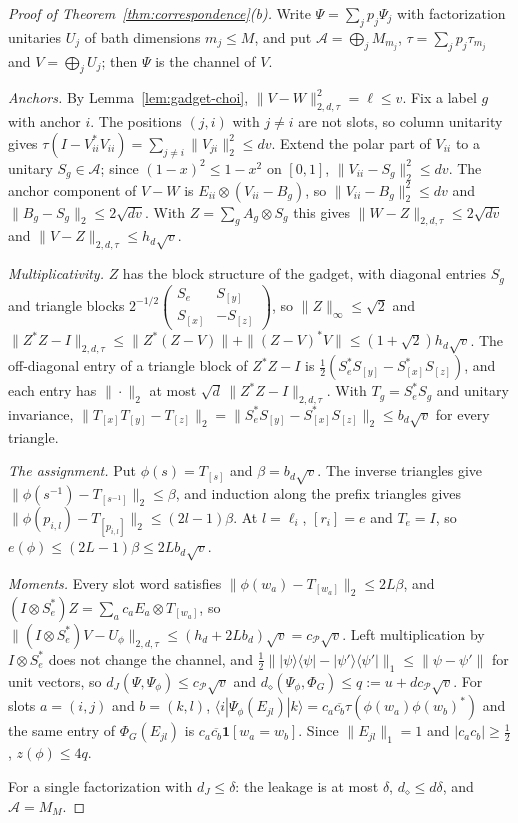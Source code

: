 \documentclass[11pt,a4paper]{article}
\theoremstyle{plain}
\theoremstyle{definition}
\theoremstyle{remark}
\newcommand{\dJ}{d_J}
\newcommand{\ddia}{d_\diamond}
\begin{document}
\begin{proof}[Proof of Theorem~\ref{thm:correspondence}(b)]
Write $\Psi=\sum_jp_j\Psi_j$ with factorization unitaries $U_j$ of bath dimensions $m_j\le M$, and put $\mathcal A=\bigoplus_jM_{m_j}$,
$\tau=\sum_jp_j\tau_{m_j}$ and $V=\bigoplus_jU_j$; then $\Psi$ is the channel of $V$.

\emph{Anchors.} By Lemma~\ref{lem:gadget-choi}, $\|V-W\|_{2,d,\tau}^2=\ell\le v$. Fix a label $g$ with anchor $i$. The positions $(j,i)$ with $j\ne i$ are not slots, so
column unitarity gives $\tau(I-V_{ii}^*V_{ii})=\sum_{j\ne i}\|V_{ji}\|_2^2\le dv$. Extend the polar part of $V_{ii}$ to a unitary $S_g\in\mathcal A$; since
$(1-x)^2\le1-x^2$ on $[0,1]$, $\|V_{ii}-S_g\|_2^2\le dv$. The anchor component of $V-W$ is $E_{ii}\otimes(V_{ii}-B_g)$, so $\|V_{ii}-B_g\|_2^2\le dv$ and
$\|B_g-S_g\|_2\le2\sqrt{dv}$. With $Z=\sum_gA_g\otimes S_g$ this gives $\|W-Z\|_{2,d,\tau}\le2\sqrt{dv}$ and $\|V-Z\|_{2,d,\tau}\le h_d\sqrt v$.

\emph{Multiplicativity.} $Z$ has the block structure of the gadget, with diagonal entries $S_g$ and triangle blocks
$2^{-1/2}\left(\begin{smallmatrix}S_e&S_{[y]}\\S_{[x]}&-S_{[z]}\end{smallmatrix}\right)$, so $\|Z\|_\infty\le\sqrt2$ and
$\|Z^*Z-I\|_{2,d,\tau}\le\|Z^*(Z-V)\|+\|(Z-V)^*V\|\le(1+\sqrt2)h_d\sqrt v$. The off-diagonal entry of a triangle block of $Z^*Z-I$ is
$\frac12(S_e^*S_{[y]}-S_{[x]}^*S_{[z]})$, and each entry has $\|\cdot\|_2$ at most $\sqrt d\,\|Z^*Z-I\|_{2,d,\tau}$. With $T_g=S_e^*S_g$ and unitary invariance,
$\|T_{[x]}T_{[y]}-T_{[z]}\|_2=\|S_e^*S_{[y]}-S_{[x]}^*S_{[z]}\|_2\le b_d\sqrt v$ for every triangle.

\emph{The assignment.} Put $\phi(s)=T_{[s]}$ and $\beta=b_d\sqrt v$. The inverse triangles give $\|\phi(s^{-1})-T_{[s^{-1}]}\|_2\le\beta$, and induction along the
prefix triangles gives $\|\phi(p_{i,l})-T_{[p_{i,l}]}\|_2\le(2l-1)\beta$. At $l=\ell_i$, $[r_i]=e$ and $T_e=I$, so $e(\phi)\le(2L-1)\beta\le2Lb_d\sqrt v$.

\emph{Moments.} Every slot word satisfies $\|\phi(w_a)-T_{[w_a]}\|_2\le2L\beta$, and $(I\otimes S_e^*)Z=\sum_ac_aE_a\otimes T_{[w_a]}$, so
$\|(I\otimes S_e^*)V-U_\phi\|_{2,d,\tau}\le(h_d+2Lb_d)\sqrt v=c_{\mathcal P}\sqrt v$. Left multiplication by $I\otimes S_e^*$ does not change the channel, and
$\frac12\||\psi\rangle\langle\psi|-|\psi'\rangle\langle\psi'|\|_1\le\|\psi-\psi'\|$ for unit vectors, so $\dJ(\Psi,\Psi_\phi)\le c_{\mathcal P}\sqrt v$ and
$\ddia(\Psi_\phi,\Phi_G)\le q:=u+dc_{\mathcal P}\sqrt v$. For slots $a=(i,j)$ and $b=(k,l)$, $\langle i|\Psi_\phi(E_{jl})|k\rangle=c_a\overline{c_b}\tau(\phi(w_a)\phi(w_b)^*)$ and the same
entry of $\Phi_G(E_{jl})$ is $c_a\overline{c_b}\mathbf 1[w_a=w_b]$. Since $\|E_{jl}\|_1=1$ and $|c_ac_b|\ge\frac12$, $z(\phi)\le4q$.

For a single factorization with $\dJ\le\delta$: the leakage is at most $\delta$, $\ddia\le d\delta$, and $\mathcal A=M_M$.
\end{proof}
\end{document}
